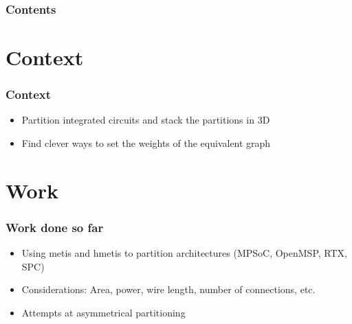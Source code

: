 \documentclass[xcolor={x11names, rgb, usenames, dvipsnames}]{beamer}
\author{Quentin Delhaye}
\title[Partitioning for 3D stacking]{Automated System Partitioning \\ for Efficient 3D Circuit Integration \\\rule{2cm}{0.3pt} ~\\ Work presentation}
\institute[BEAMS]{Université Libre de Bruxelles}
\date{October 30th, 2015}
\begin{document}
\begin{frame}
\titlepage
\end{frame}

\begin{frame}
	\frametitle{Contents}
	\tableofcontents[hideallsubsections]
\end{frame}



\section{Context}

\begin{frame}
\frametitle{Context}
\begin{itemize}
	\item Partition integrated circuits and stack the partitions in 3D
  \item Find clever ways to set the weights of the equivalent graph
\end{itemize}
\end{frame}

\section{Work}
\begin{frame}
  \frametitle{Work done so far}
  \begin{itemize}
    \item Using metis and hmetis to partition architectures (MPSoC, OpenMSP, RTX, SPC)
    \item Considerations: Area, power, wire length, number of connections, etc.
    \item Attempts at asymmetrical partitioning
  \end{itemize}
\end{frame}
\end{document}
